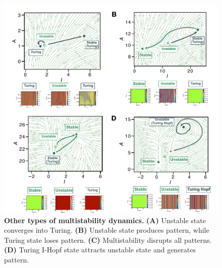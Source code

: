 \begin{figure}[!h]
    \includegraphics[width=1\textwidth]{figures/multistability_leftovers}

    \caption{\textbf{Other types of multistability dynamics.} \textbf{(A)} Unstable state converges into Turing. \textbf{(B)} Unstable state produces pattern, while Turing state loses pattern. \textbf{(C)} Multistability disrupts all patterns. \textbf{(D)} Turing I-Hopf state attracts unstable state and generates pattern.}

    \label{sup_fig4}
\end{figure}

